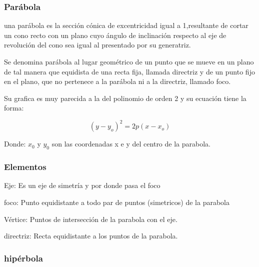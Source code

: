     \subsubsection*{Parábola} \label{Parábola}

    una parábola  es la sección cónica de excentricidad
    igual a 1,resultante de cortar un cono recto con un plano cuyo
    ángulo de inclinación respecto al eje de revolución del cono sea igual al
    presentado por su generatriz.

    Se denomina parábola al lugar geométrico de un punto que se mueve en un
    plano de tal manera que equidista de una recta fija, llamada directriz y de
    un punto fijo en el plano, que no pertenece a la parábola ni a la
    directriz, llamado foco.

    Su grafica es muy parecida a la del polinomio de orden 2 y su ecuación tiene
    la forma:

    $$ (y-y_o)^2 =2p(x-x_o) $$

    Donde: $x_0$ y $y_0$ son las coordenadas x e y del centro de la parabola.

    \subsubsection*{Elementos} \label{Elementos}

    Eje: Es un eje de simetría y por donde pasa el foco

    foco: Punto equidistante a todo par de puntos (simetricos)  de la parabola

    Vértice: Puntos de intersección de la parabola con el eje.

    directriz: Recta equidistante a los puntos de la parabola.





    \subsubsection*{hipérbola} \label{hipérbola}

